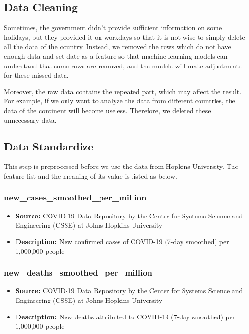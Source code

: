 \documentclass{article}
\begin{document}
\begin{multicols}{2}
\subsection{Data Cleaning}
Sometimes, the government didn’t provide sufficient information on some holidays, but they provided it on workdays so that it is not wise to simply delete all the data of the country. Instead, we removed the rows which do not have enough data and set date as a feature so that machine learning models can understand that some rows are removed, and the models will make adjustments for these missed data.

Moreover, the raw data contains the repeated part, which may affect the result. For example, if we only want to analyze the data from different countries, the data of the continent will become useless. Therefore, we deleted these unnecessary data.

\subsection{Data Standardize}
This step is preprocessed before we use the data from Hopkins University. The feature list and the meaning of its value is listed as below.

\subsubsection{new\_cases\_smoothed\_per\_million}
\begin{itemize}
    \item \textbf{Source:} COVID-19 Data Repository by the Center for Systems Science and Engineering (CSSE) at Johns Hopkins University
    \item \textbf{Description:} New confirmed cases of COVID-19 (7-day smoothed) per 1,000,000 people
\end{itemize}

\subsubsection{new\_deaths\_smoothed\_per\_million}
\begin{itemize}
    \item \textbf{Source:} COVID-19 Data Repository by the Center for Systems Science and Engineering (CSSE) at Johns Hopkins University
    \item \textbf{Description:} New deaths attributed to COVID-19 (7-day smoothed) per 1,000,000 people
\end{itemize}


\end{multicols}
\end{document}
